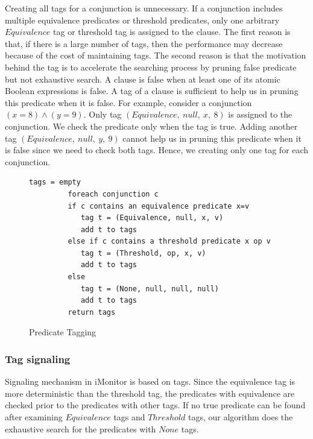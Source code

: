 \documentclass[preprint]{sigplanconf}
\begin{document}
Creating all tags for a conjunction is unnecessary. If a conjunction includes 
multiple equivalence predicates or threshold predicates, only one arbitrary 
$Equivalence$ tag or threshold tag is assigned to the clause. The first reason is 
that, if there is a large number of tags, then the performance may decrease
because of the cost of maintaining tags. The second reason is that the motivation behind 
the tag is to accelerate the searching process by pruning false predicate 
but not exhaustive search.  A clause is false when at least one 
of its atomic Boolean expressions is false. A tag of a clause is sufficient to 
help us in pruning this predicate when it is false. For example, consider a
conjunction $(x = 8) \wedge (y = 9)$. Only tag $(Equivalence,\ null,\ x,\ 8)$
is assigned to the conjunction. We check the predicate only when the tag is
true. Adding another tag $(Equivalence,\ null,\ y,\ 9)$ cannot help us in pruning
this predicate when it is false since we need to check both tags. Hence, we 
creating only one tag for each conjunction.
 
\begin{figure}[ht!]
    \begin{Verbatim}[fontsize=\footnotesize,gobble=8,frame=lines,
            framesep=3mm]
         tags = empty
         foreach conjunction c 
         if c contains an equivalence predicate x=v
            tag t = (Equivalence, null, x, v)
            add t to tags
         else if c contains a threshold predicate x op v
            tag t = (Threshold, op, x, v)
            add t to tags
         else 
            tag t = (None, null, null, null)
            add t to tags
         return tags
    \end{Verbatim}
  \caption{Predicate Tagging}
  \label{fig:tagging}
\end{figure}


\subsubsection{Tag signaling}
Signaling mechanism in iMonitor is based on tags. 
Since the equivalence tag is more deterministic than the threshold tag, the
predicates with equivalence are checked prior to the predicates with other 
tags. If no true predicate can be found after examining $Equivalence$ tags and
$Threshold$ tags, our algorithm does the exhaustive search for the predicates 
with $None$ tags. 
\end{document}
